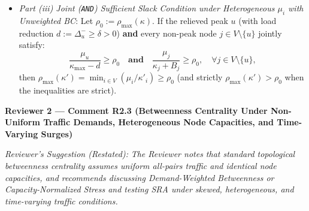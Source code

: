 \documentclass[11pt,a4paper]{article}
\newcommand{\cbox}[2]{%
  \vspace{0.6em}\noindent\textbf{#1}\par\smallskip
  \noindent\textit{Reviewer's Suggestion (Restated):} \textit{#2}\par\smallskip
}
\begin{document}
\begin{enumerate}[leftmargin=1.8em]
\begin{itemize}
        \item \textit{Part (iii) Joint (\texttt{AND}) Sufficient Slack Condition under Heterogeneous $\mu_i$ with Unweighted BC}: Let $\rho_0 := \rho_{\max}(\kappa)$. If the relieved peak $u$ (with load reduction $d := \Delta_u^- \ge \delta > 0$) \textbf{and} every non-peak node $j \in V\setminus\{u\}$ jointly satisfy:
        \[
            \frac{\mu_u}{\kappa_{\max} - d} \ge \rho_0 \quad \textbf{and} \quad \frac{\mu_j}{\kappa_j + B_j} \ge \rho_0, \quad \forall j \in V \setminus \{u\},
        \]
        then $\rho_{\max}(\kappa') = \min_{i\in V}(\mu_i/\kappa'_i) \ge \rho_0$ (and strictly $\rho_{\max}(\kappa') > \rho_0$ when the inequalities are strict).
    \end{itemize}
\end{enumerate}

\hrulefill

\cbox{Reviewer 2 --- Comment R2.3 (Betweenness Centrality Under Non-Uniform Traffic Demands, Heterogeneous Node Capacities, and Time-Varying Surges)}{The Reviewer notes that standard topological betweenness centrality assumes uniform all-pairs traffic and identical node capacities, and recommends discussing Demand-Weighted Betweenness or Capacity-Normalized Stress and testing SRA under skewed, heterogeneous, and time-varying traffic conditions.}
\end{document}
